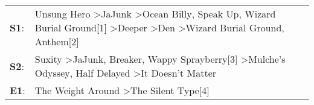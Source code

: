 \begin{supertabular}{p{0.03\textwidth}p{0.92\textwidth}}
 \textbf{S1}:  &  Unsung Hero\textsuperscript{} \textgreater \enspace JaJunk\textsuperscript{} \textgreater \enspace Ocean Billy\textsuperscript{}, \enspace Speak Up\textsuperscript{}, \enspace Wizard Burial Ground[1]\textsuperscript{} \textgreater \enspace Deeper\textsuperscript{} \textgreater \enspace Den\textsuperscript{} \textgreater \enspace Wizard Burial Ground\textsuperscript{}, \enspace Anthem[2]\textsuperscript{}  \enspace  \\
 \textbf{S2}:  &                                                                                                  Suxity\textsuperscript{} \textgreater \enspace JaJunk\textsuperscript{}, \enspace Breaker\textsuperscript{}, \enspace Wappy Sprayberry[3]\textsuperscript{} \textgreater \enspace Mulche's Odyssey\textsuperscript{}, \enspace Half Delayed\textsuperscript{} \textgreater \enspace It Doesn't Matter\textsuperscript{}  \enspace  \\
 \textbf{E1}:  &                                                                                                                                                                                                                                                                                                                           The Weight Around\textsuperscript{} \textgreater \enspace The Silent Type[4]\textsuperscript{}  \enspace  \\
\end{supertabular}
